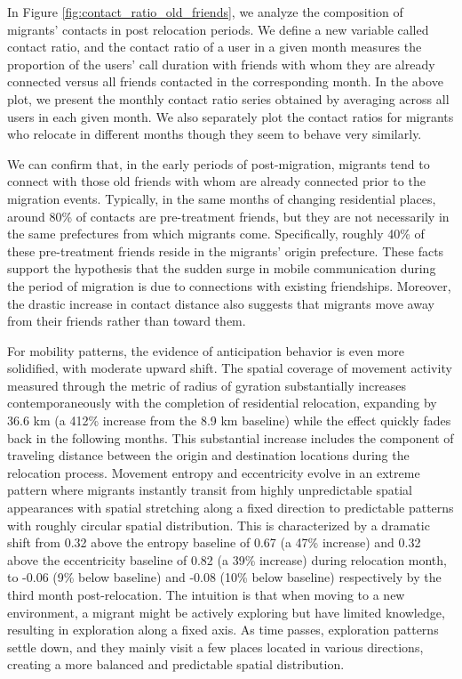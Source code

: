 In Figure \ref{fig:contact_ratio_old_friends}, we analyze the composition of migrants' contacts in post relocation periods.
We define a new variable called contact ratio, and the contact ratio of a user in a given month measures the proportion of the users' call duration with friends with whom they are already connected versus all friends contacted in the corresponding month.
In the above plot, we present the monthly contact ratio series obtained by averaging across all users in each given month.
We also separately plot the contact ratios for migrants who relocate in different months though they seem to behave very similarly.

We can confirm that, in the early periods of post-migration, migrants tend to connect with those old friends with whom are already connected prior to the migration events.
Typically, in the same months of changing residential places, around 80\% of contacts are pre-treatment friends, but they are not necessarily in the same prefectures from which migrants come.
Specifically, roughly 40\% of these pre-treatment friends reside in the migrants' origin prefecture.
These facts support the hypothesis that the sudden surge in mobile communication during the period of migration is due to connections with existing friendships.
Moreover, the drastic increase in contact distance also suggests that migrants move away from their friends rather than toward them.

For mobility patterns, the evidence of anticipation behavior is even more solidified, with moderate upward shift.
The spatial coverage of movement activity measured through the metric of radius of gyration substantially increases contemporaneously with the completion of residential relocation, expanding by 36.6 km (a 412\% increase from the 8.9 km baseline) while the effect quickly fades back in the following months. This substantial increase includes the component of traveling distance between the origin and destination locations during the relocation process.
Movement entropy and eccentricity evolve in an extreme pattern where migrants instantly transit from highly unpredictable spatial appearances with spatial stretching along a fixed direction to predictable patterns with roughly circular spatial distribution.
This is characterized by a dramatic shift from 0.32 above the entropy baseline of 0.67 (a 47\% increase) and 0.32 above the eccentricity baseline of 0.82 (a 39\% increase) during relocation month, to -0.06 (9\% below baseline) and -0.08 (10\% below baseline) respectively by the third month post-relocation. The intuition is that when moving to a new environment, a migrant might be actively exploring but have limited knowledge, resulting in exploration along a fixed axis. As time passes, exploration patterns settle down, and they mainly visit a few places located in various directions, creating a more balanced and predictable spatial distribution.

